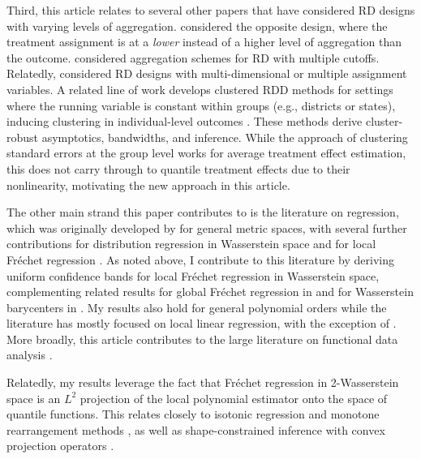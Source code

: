 \documentclass[12pt]{article}
\begin{document}
Third, this article relates to several other papers that have considered RD designs with varying levels of aggregation. \citet{borusyak2024regression} considered the opposite design, where the treatment assignment is at a \emph{lower} instead of a higher level of aggregation than the outcome. \citet{cattaneo2016interpreting, cattaneo2021extrapolating, bertanha2020regression} considered aggregation schemes for RD with multiple cutoffs. Relatedly, \citet{gunsilius2023free, papay2011extending, cheng2023estimation} considered RD designs with multi-dimensional or multiple assignment variables. A related line of work develops clustered RDD methods for settings where the running variable is constant within groups (e.g., districts or states), inducing clustering in individual-level outcomes \citep{lee2008regression, lee2010regression, barreca2016heaping, bartalotti2017regression, cattaneo2016inference, kolesar2018inference, cattaneo2022regression}. These methods derive cluster-robust asymptotics, bandwidths, and inference. While the approach of clustering  standard errors at the group level works for average treatment effect estimation, this does not carry through to quantile treatment effects due to their nonlinearity, motivating the new approach in this article. 

The other main strand this paper contributes to is the literature on \citet{frechet1948elements} regression, which was originally developed by \citet{petersen2019frechet} for general metric spaces, with several further contributions for distribution regression in Wasserstein space \citep{chen2023wasserstein, fan2022conditional, chen2023sliced, ghodrati2022distribution, zhou2024wasserstein} and for local Fr\'echet regression \citep{chen2022uniform, iao2024deep, qiu2024random}. As noted above, I contribute to this literature by deriving uniform confidence bands for local Fr\'echet regression in Wasserstein space, complementing related results for global Fr\'echet regression in \citet{petersen2021wasserstein} and for Wasserstein barycenters in \citet{carlier2021entropic, agueh2017vers, kroshnin2021statistical}. My results also hold for general polynomial orders while the literature has mostly focused on local linear regression, with the exception of \citet{schotz2022nonparametric}. More broadly, this article contributes to the large literature on functional data analysis \citep{ramsay2005functional}. 

Relatedly, my results leverage the fact that Fr\'echet regression in 2-Wasserstein space is an $L^2$ projection of the local polynomial estimator onto the space of quantile functions. This relates closely to isotonic regression \citep{barlow1972statistical, groeneboom2010generalized, lin2019projection} and  monotone rearrangement methods \citep{chernozhukov2010quantile}, as well as shape-constrained inference with convex projection operators \citep{chetverikov2018econometrics, groeneboom2014nonparametric, fang2021projection, dumbgen2024shape}. 
\end{document}
